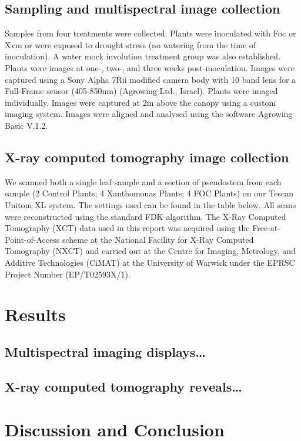 \subsection{Sampling and multispectral image collection}
Samples from four treatments were collected. Plants were inoculated with Foc or Xvm or were exposed to drought stress (no watering from the time of inoculation). A water mock involution treatment group was also established. Plants were images at one-, two-, and three weeks post-inoculation. 
Images were captured using a Sony Alpha 7Rii modified camera body with 10 band lens for a Full-Frame sensor (405-850nm) (Agrowing Ltd., Israel). Plants were imaged individually. Images were captured at 2m above the canopy using a custom imaging system. Images were aligned and analysed using the software Agrowing Basic V.1.2.
\subsection{X-ray computed tomography image collection}
We scanned both a single leaf sample and a section of pseudostem from each sample (2 Control Plants; 4 Xanthomonas Plants; 4 FOC Plants) on our Tescan Unitom XL system. The settings used can be found in the table below. All scans were reconstructed using the standard FDK algorithm.
The X-Ray Computed Tomography (XCT) data used in this report was acquired using the Free-at-Point-of-Access scheme at the National Facility for X-Ray Computed Tomography (NXCT) and carried out at the Centre for Imaging, Metrology, and Additive Technologies (CiMAT) at the University of Warwick under the EPRSC Project Number (EP/T02593X/1).

\section{Results }
\subsection{Multispectral imaging displays…}
\subsection{X-ray computed tomography reveals…}

\section{Discussion and Conclusion}

